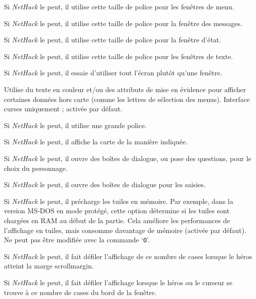 \documentclass[titlepage]{article}
\begin{document}
\begin{description}[font=\mdseries\itshape]
Si \textit{NetHack} le peut, il utilise cette taille de police pour les fenêtres de menu.
\item[font\textunderscore size\textunderscore message]
Si \textit{NetHack} le peut, il utilise cette taille de police pour la fenêtre des messages.
\item[font\textunderscore size\textunderscore status]
Si \textit{NetHack} le peut, il utilise cette taille de police pour la fenêtre d'état.
\item[font\textunderscore size\textunderscore text]
Si \textit{NetHack} le peut, il utilise cette taille de police pour les fenêtres de texte.
\item[fullscreen]
Si \textit{NetHack} le peut, il essaie d'utiliser tout l'écran plutôt qu'une fenêtre.
\item[guicolor]
Utilise du texte en couleur et/ou des attributs de mise en évidence pour
afficher certaines données hors carte (comme les lettres de sélection des menus).
Interface curses uniquement ; activée par défaut.
\item[large\textunderscore font]
Si \textit{NetHack} le peut, il utilise une grande police.
\item[map\textunderscore mode]
Si \textit{NetHack} le peut, il affiche la carte de la manière indiquée.
\item[player\textunderscore selection]
Si \textit{NetHack} le peut, il ouvre des boîtes de dialogue, ou pose des questions, pour le choix du personnage.
\item[popup\textunderscore dialog]
Si \textit{NetHack} le peut, il ouvre des boîtes de dialogue pour les saisies.
\item[preload\textunderscore tiles]
Si \textit{NetHack} le peut, il précharge les tuiles en mémoire.
Par exemple, dans la version MS-DOS en mode protégé, cette option détermine
si les tuiles sont chargées en RAM au début de la partie.  Cela
améliore les performances de l'affichage en tuiles, mais consomme davantage
de mémoire (activée par défaut).
Ne peut pas être modifiée avec la commande `\texttt{O}'.
\item[scroll\textunderscore amount]
Si \textit{NetHack} le peut, il fait défiler l'affichage de ce nombre de cases
lorsque le héros atteint la marge scroll\textunderscore margin.
\item[scroll\textunderscore margin]
Si \textit{NetHack} le peut, il fait défiler l'affichage lorsque le héros ou le curseur
se trouve à ce nombre de cases du bord de la fenêtre.

\end{description}
\end{document}
